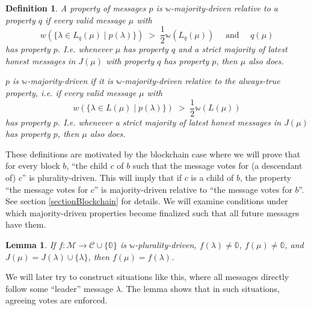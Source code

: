 \documentclass[12pt]{article}
\newtheorem{lemma}{Lemma}
\newtheorem{definition}{Definition}
\begin{document}
\begin{definition}
A property of messages $p$ is \emph{$\mathbb{w}$-majority-driven relative to} a property $q$ if every valid message $\mu$ with
  $$w (\{\lambda \in L_q(\mu) \mid p(\lambda) \}) \;>\; \frac{1}{2} \mathbb{w}(L_q(\mu)) \quad \text{ and } \quad q(\mu)$$
has property $p$. I.e. whenever $\mu$ has property $q$ and a strict majority of latest honest messages in $J(\mu)$ with property $q$ has property $p$, then $\mu$ also does.

$p$ is \emph{$\mathbb{w}$-majority-driven} if it is $\mathbb{w}$-majority-driven relative to the always-true property, i.e. if every valid message $\mu$ with
$$w (\{\lambda \in L(\mu) \mid p(\lambda) \}) \;>\; \frac{1}{2} \mathbb{w}(L(\mu))$$
has property $p$. I.e. whenever a strict majority of latest honest messages in $J(\mu)$ has property $p$, then $\mu$ also does.
\end{definition}

These definitions are motivated by the blockchain case where we will prove that for every block $b$, ``the child $c$ of $b$ such that the message votes for (a descendant of) $c$'' is plurality-driven. This will imply that if $c$ is a child of $b$, the property ``the message votes for $c$'' is majority-driven relative to ``the message votes for $b$''. See section \ref{sectionBlockchain} for details. We will examine conditions under which majority-driven properties become finalized such that all future messages have them.

\begin{lemma}\label{leaderLemma}
  If $f: \mathcal{M} \rightarrow \mathcal{C} \cup \{ \mathbb{0} \}$ is $\mathbb{w}$-plurality-driven, $f(\lambda) \neq \mathbb{0}$, $f(\mu) \neq \mathbb{0}$, and $J(\mu) = J(\lambda) \cup \{\lambda\}$, then $f(\mu) = f(\lambda)$.
\end{lemma}

We will later try to construct situations like this, where all messages directly follow some ``leader'' message $\lambda$. The lemma shows that in such situations, agreeing votes are enforced.
\end{document}

